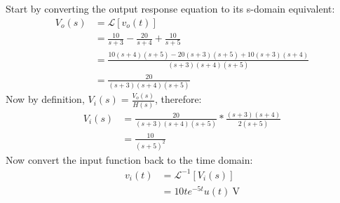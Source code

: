 Start by converting the output response equation to its s-domain equivalent:
\begin{align*}
	V_o(s) &= \mathcal{L}[v_o(t)] \\
	&= \frac{10}{s+3} - \frac{20}{s+4} + \frac{10}{s+5} \\
	&= \frac{10(s+4)(s+5) - 20(s+3)(s+5) + 10(s+3)(s+4)}{(s+3)(s+4)(s+5)} \\
	&= \frac{20}{(s+3)(s+4)(s+5)}
\end{align*}
Now by definition, $V_i(s) = \frac{V_o(s)}{H(s)}$, therefore:
\begin{align*}
	V_i(s) &= \frac{20}{(s+3)(s+4)(s+5)} * \frac{(s+3)(s+4)}{2(s+5)} \\
	&= \frac{10}{(s+5)^2}
\end{align*}
Now convert the input function back to the time domain:
\begin{align*}
	v_i(t) &= \mathcal{L}^{-1}[V_i(s)] \\
	&= 10te^{-5t} u(t) \ \mathrm{V}
\end{align*}
